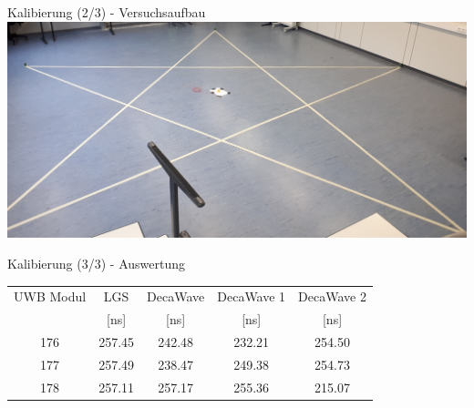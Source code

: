 \documentclass{beamer}
\begin{document}
%
%
\begin{frame}{Kalibierung (2/3) - Versuchsaufbau}
	\centering
	\includegraphics[width=\linewidth]{calibration_pentagram2}
\end{frame}


%
%
%
\begin{frame}{Kalibierung (3/3) - Auswertung}
	\begin{table}
		\centering
		\begin{tabular}{||c||c||ccc||}
			\hline
			UWB Modul & LGS & DecaWave & DecaWave 1 & DecaWave 2 \\
			& [\si{\nano\second}] & [\si{\nano\second}] & [\si{\nano\second}] & [\si{\nano\second}] \\
			\hline
			\hline
			176 & \num{257.45} & \num{242.48} & \num{232.21} & \num{254.50} \\
			177 & \num{257.49} & \num{238.47} & \num{249.38} & \num{254.73} \\
			178 & \num{257.11} & \num{257.17} & \num{255.36} & \num{215.07} \\
			\hline
		\end{tabular}
	\end{table}
\end{frame}
\end{document}
